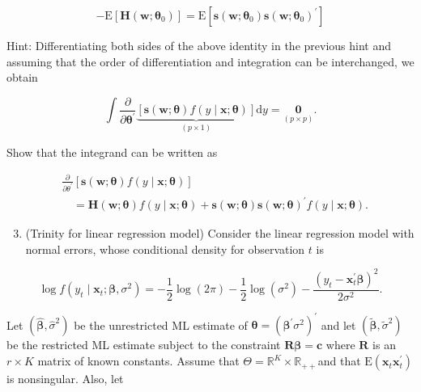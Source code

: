 \documentclass[10pt]{article}
\begin{document}
$$
-\mathrm{E}\left[\mathbf{H}\left(\mathbf{w} ; \boldsymbol{\theta}_{0}\right)\right]=\mathrm{E}\left[\mathbf{s}\left(\mathbf{w} ; \boldsymbol{\theta}_{0}\right) \mathbf{s}\left(\mathbf{w} ; \boldsymbol{\theta}_{0}\right)^{\prime}\right]
$$

Hint: Differentiating both sides of the above identity in the previous hint and assuming that the order of differentiation and integration can be interchanged, we obtain

$$
\int \frac{\partial}{\partial \boldsymbol{\theta}^{\prime}} \underbrace{[\mathbf{s}(\mathbf{w} ; \boldsymbol{\theta}) f(y \mid \mathbf{x} ; \boldsymbol{\theta})]}_{(p \times 1)} \mathrm{d} y=\underset{(p \times p)}{\mathbf{0}} .
$$

Show that the integrand can be written as

$$
\begin{aligned}
& \frac{\partial}{\partial \theta^{\prime}}[\mathbf{s}(\mathbf{w} ; \boldsymbol{\theta}) f(y \mid \mathbf{x} ; \boldsymbol{\theta})] \\
& \quad=\mathbf{H}(\mathbf{w} ; \boldsymbol{\theta}) f(y \mid \mathbf{x} ; \boldsymbol{\theta})+\mathbf{s}(\mathbf{w} ; \boldsymbol{\theta}) \mathbf{s}(\mathbf{w} ; \boldsymbol{\theta})^{\prime} f(y \mid \mathbf{x} ; \boldsymbol{\theta}) .
\end{aligned}
$$

\begin{enumerate}
  \setcounter{enumi}{2}
  \item (Trinity for linear regression model) Consider the linear regression model with normal errors, whose conditional density for observation $t$ is
\end{enumerate}

$$
\log f\left(y_{t} \mid \mathbf{x}_{t} ; \boldsymbol{\beta}, \sigma^{2}\right)=-\frac{1}{2} \log (2 \pi)-\frac{1}{2} \log \left(\sigma^{2}\right)-\frac{\left(y_{t}-\mathbf{x}_{t}^{\prime} \boldsymbol{\beta}\right)^{2}}{2 \sigma^{2}} .
$$

Let $\left(\widehat{\boldsymbol{\beta}}, \hat{\sigma}^{2}\right)$ be the unrestricted ML estimate of $\boldsymbol{\theta}=\left(\boldsymbol{\beta}^{\prime} \sigma^{2}\right)^{\prime}$ and let $\left(\tilde{\boldsymbol{\beta}}, \tilde{\sigma}^{2}\right)$ be the restricted ML estimate subject to the constraint $\mathbf{R} \boldsymbol{\beta}=\mathbf{c}$ where $\mathbf{R}$ is an $r \times K$ matrix of known constants. Assume that $\Theta=\mathbb{R}^{K} \times \mathbb{R}_{++}$and that $\mathrm{E}\left(\mathbf{x}_{t} \mathbf{x}_{t}^{\prime}\right)$ is nonsingular. Also, let
\end{document}
